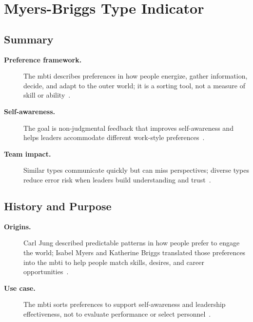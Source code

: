 \documentclass[../main.tex]{subfiles}
\begin{document}
\section{Myers-Briggs Type Indicator}

\subsection{Summary}
\begin{description}
  \item[\textbf{Preference framework.}] The \ac{mbti} describes preferences in how people energize, gather information, decide, and adapt to the outer world; it is a sorting tool, not a measure of skill or ability~\autocite{edo-5-1-8-mbti-2025}.
  \item[\textbf{Self-awareness.}] The goal is non-judgmental feedback that improves self-awareness and helps leaders accommodate different work-style preferences~\autocite{edo-5-1-8-mbti-2025}.
  \item[\textbf{Team impact.}] Similar types communicate quickly but can miss perspectives; diverse types reduce error risk when leaders build understanding and trust~\autocite{edo-5-1-8-mbti-2025}.
\end{description}

\subsection{History and Purpose}
\begin{description}
  \item[\textbf{Origins.}] Carl Jung described predictable patterns in how people prefer to engage the world; Isabel Myers and Katherine Briggs translated those preferences into the \ac{mbti} to help people match skills, desires, and career opportunities~\autocite{edo-5-1-8-mbti-2025}.
  \item[\textbf{Use case.}] The \ac{mbti} sorts preferences to support self-awareness and leadership effectiveness, not to evaluate performance or select personnel~\autocite{edo-5-1-8-mbti-2025}.
\end{description}
\end{document}

